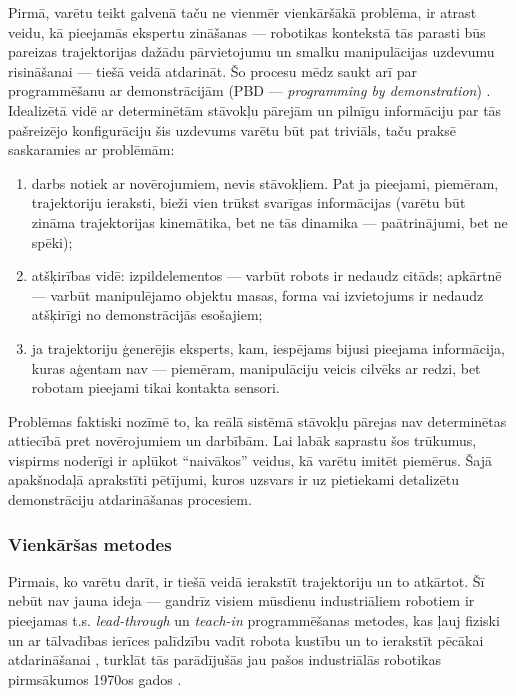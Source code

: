 \documentclass[12pt, a4paper]{article}
\numberwithin{equation}{section} %
\begin{document}
Pirmā, varētu teikt galvenā taču ne vienmēr vienkāršākā problēma, ir atrast veidu, kā pieejamās ekspertu zināšanas --- robotikas kontekstā tās parasti būs pareizas trajektorijas dažādu pārvietojumu un smalku manipulācijas uzdevumu risināšanai --- tiešā veidā atdarināt. Šo procesu mēdz saukt arī par programmēšanu ar demonstrācijām (PBD --- \textit{programming by demonstration}) \cite{muench1994robot,billard2008handbook}. Idealizētā vidē ar determinētām stāvokļu pārejām un pilnīgu informāciju par tās pašreizējo konfigurāciju šis uzdevums varētu būt pat triviāls, taču praksē saskaramies ar problēmām:

\begin{enumerate}
    \item darbs notiek ar novērojumiem, nevis stāvokļiem. Pat ja pieejami, piemēram, trajektoriju ieraksti, bieži vien trūkst svarīgas informācijas (varētu būt zināma trajektorijas kinemātika, bet ne tās dinamika --- paātrinājumi, bet ne spēki);
    \item atšķirības vidē: izpildelementos --- varbūt robots ir nedaudz citāds; apkārtnē --- varbūt manipulējamo objektu masas, forma vai izvietojums ir nedaudz atšķirīgi no demonstrācijās esošajiem;
    \item ja trajektoriju ģenerējis eksperts, kam, iespējams bijusi pieejama informācija, kuras aģentam nav --- piemēram, manipulāciju veicis cilvēks ar redzi, bet robotam pieejami tikai kontakta sensori.
\end{enumerate}

Problēmas faktiski nozīmē to, ka reālā sistēmā stāvokļu pārejas nav determinētas attiecībā pret novērojumiem un darbībām. Lai labāk saprastu šos trūkumus, vispirms noderīgi ir aplūkot ``naivākos'' veidus, kā varētu imitēt piemērus. Šajā apakšnodaļā aprakstīti pētījumi, kuros uzsvars ir uz pietiekami detalizētu demonstrāciju atdarināšanas procesiem.

\subsubsection{Vienkāršas metodes}

Pirmais, ko varētu darīt, ir tiešā veidā ierakstīt trajektoriju un to atkārtot. Šī nebūt nav jauna ideja --- gandrīz visiem mūsdienu industriāliem robotiem ir pieejamas t.s. \textit{lead-through} un \textit{teach-in} programmēšanas metodes, kas ļauj fiziski un ar tālvadības ierīces palīdzību vadīt robota kustību un to ierakstīt pēcākai atdarināšanai \cite{teach_pendant}, turklāt tās parādījušās jau pašos industriālās robotikas pirmsākumos 1970os gados \cite{abb2016special}.
\end{document}
